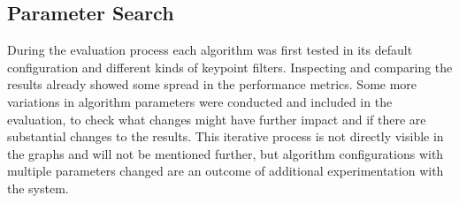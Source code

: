\subsection{Parameter Search}

During the evaluation process each algorithm was first tested in its default configuration and different kinds of keypoint filters.
Inspecting and comparing the results already showed some spread in the performance metrics.
Some more variations in algorithm parameters were conducted and included in the evaluation, to check what changes might have further impact and if there are substantial changes to the results.
This iterative process is not directly visible in the graphs and will not be mentioned further, but algorithm configurations with multiple parameters changed are an outcome of additional experimentation with the system.

